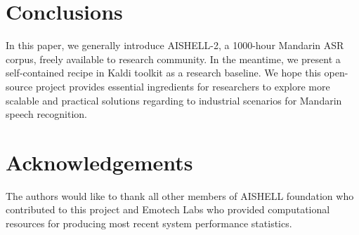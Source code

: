 \documentclass[a4paper]{article}
\begin{document}
% 

\section{Conclusions}

In this paper, we generally introduce AISHELL-2, a 1000-hour Mandarin ASR corpus, freely available to research community. In the meantime, we present a self-contained recipe in Kaldi toolkit as a research baseline. We hope this open-source project provides essential ingredients for researchers to explore more scalable and practical solutions regarding to industrial scenarios for Mandarin speech recognition.

\section{Acknowledgements}

The authors would like to thank all other members of AISHELL foundation who contributed to this project and Emotech Labs who provided computational resources for producing most recent system performance statistics.




\end{document}
